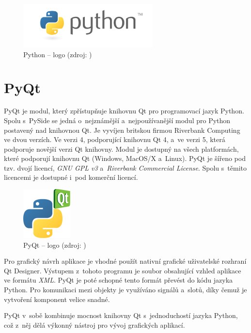\documentclass[a4paper,12pt,oneside]{book}
\begin{document}
\begin{figure}[htb]
\centering
\includegraphics[scale=.7]{images/python-logo.png}
\caption[Python -- logo]{Python -- logo (zdroj: \cite{python_web})}
\end{figure}

\newpage
\section{PyQt}

PyQt je modul, který zpřístupňuje knihovnu Qt pro programovací jazyk
Python. Spolu s~PySide se jedná o~nejznámější a~nejpoužívanější modul
pro Python postavený nad knihovnou Qt. Je vyvíjen britskou firmou
Riverbank Computing ve dvou verzích. Ve verzi 4, podporující knihovnu
Qt 4, a~ve verzi 5, která podporuje novější verzi Qt knihovny. Modul
je dostupný na všech platformách, které podporují knihovnu Qt
(Windows, MacOS/X a~Linux). PyQt je šířeno pod tzv. dvojí licencí,
\textit{GNU GPL v3} a~\textit{Riverbank Commercial License}. Spolu
s~těmito licencemi je dostupné i~pod komerční licencí.

\begin{figure}[htb]
\centering
\includegraphics[scale=1]{images/pyqt-logo.png}
\caption[PyQt -- logo]{PyQt -- logo (zdroj: \cite{pyqt_wiki})}
\end{figure}

Pro grafický návrh aplikace je vhodné použít nativní grafické
uživatelské rozhraní Qt Designer. Výstupem z~tohoto programu je soubor
obsahující vzhled aplikace ve formátu \textit{XML}. PyQt je poté
schopné tento formát převést do kódu jazyka Python. Pro komunikaci
mezi objekty je využíváno signálů a~slotů, díky čemuž je vytvoření
komponent velice snadné.

PyQt v~sobě kombinuje mocnost knihovny Qt s~jednoduchostí jazyka
Python, což z~něj dělá výkonný nástroj pro vývoj grafických aplikací.
\cite{pyqt} \cite{pyqt_wiki}
\end{document}
